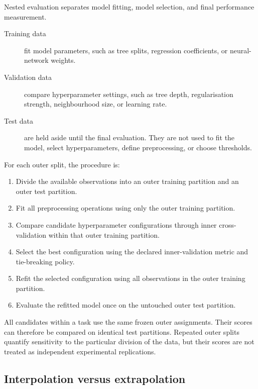 Nested evaluation separates model fitting, model selection, and final
performance measurement.

\begin{description}
  \item[Training data] fit model parameters, such as tree splits, regression
  coefficients, or neural-network weights.

  \item[Validation data] compare hyperparameter settings, such as tree depth,
  regularisation strength, neighbourhood size, or learning rate.

  \item[Test data] are held aside until the final evaluation. They are not used
  to fit the model, select hyperparameters, define preprocessing, or choose
  thresholds.
\end{description}

For each outer split, the procedure is:

\begin{enumerate}
  \item Divide the available observations into an outer training partition and
  an outer test partition.

  \item Fit all preprocessing operations using only the outer training
  partition.

  \item Compare candidate hyperparameter configurations through inner
  cross-validation within that outer training partition.

  \item Select the best configuration using the declared inner-validation
  metric and tie-breaking policy.

  \item Refit the selected configuration using all observations in the outer
  training partition.

  \item Evaluate the refitted model once on the untouched outer test
  partition.
\end{enumerate}

All candidates within a task use the same frozen outer assignments. Their
scores can therefore be compared on identical test partitions. Repeated outer
splits quantify sensitivity to the particular division of the data, but their
scores are not treated as independent experimental replications.

\subsection{Interpolation versus extrapolation}

